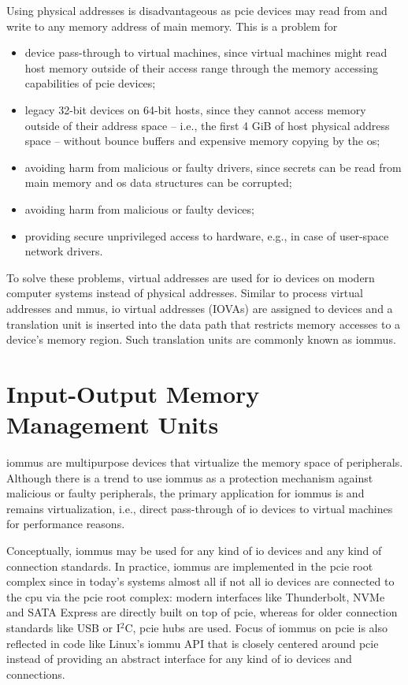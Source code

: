 Using physical addresses is disadvantageous as \ac{pcie} devices may read from
and write to any memory address of main memory. This is a problem for

\begin{itemize}
    \item device pass-through to virtual machines, since virtual machines might
        read host memory outside of their access range through the memory
        accessing capabilities of \ac{pcie} devices;
    \item legacy 32-bit devices on 64-bit hosts, since they cannot access memory
        outside of their address space -- i.e., the first 4 GiB of host physical
        address space -- without bounce buffers and expensive memory copying by
        the \ac{os};
    \item avoiding harm from malicious or faulty drivers, since secrets can be
        read from main memory and \ac{os} data structures can be corrupted;
    \item avoiding harm from malicious or faulty devices;
    \item providing secure unprivileged access to hardware, e.g., in case of
        user-space network drivers.
\end{itemize}

To solve these problems, virtual addresses are used for \ac{io} devices on
modern computer systems instead of physical addresses. Similar to process
virtual addresses and \acp{mmu}, \ac{io} virtual addresses (IOVAs) are assigned
to devices and a translation unit is inserted into the data path that restricts
memory accesses to a device's memory region. Such translation units are commonly
known as \acfp{iommu}.


\section{Input-Output Memory Management Units}
\label{sec:iommus}

\acp{iommu} are multipurpose devices that virtualize the memory space of
peripherals. Although there is a trend to use \acp{iommu} as a protection
mechanism against malicious or faulty peripherals, the primary application for
\acp{iommu} is and remains virtualization, i.e., direct pass-through of \ac{io}
devices to virtual machines for performance reasons.

Conceptually, \acp{iommu} may be used for any kind of \ac{io} devices and any
kind of connection standards. In practice, \acp{iommu} are implemented in the
\ac{pcie} root complex since in today's systems almost all if not all \ac{io}
devices are connected to the \ac{cpu} via the \ac{pcie} root complex: modern
interfaces like Thunderbolt, NVMe and SATA Express are directly built on top of
\ac{pcie}, whereas for older connection standards like USB or I$^2$C, \ac{pcie}
hubs are used. Focus of \acp{iommu} on \ac{pcie} is also reflected in code like
Linux's \ac{iommu} API that is closely centered around \ac{pcie} instead of
providing an abstract interface for any kind of \ac{io} devices and connections.

